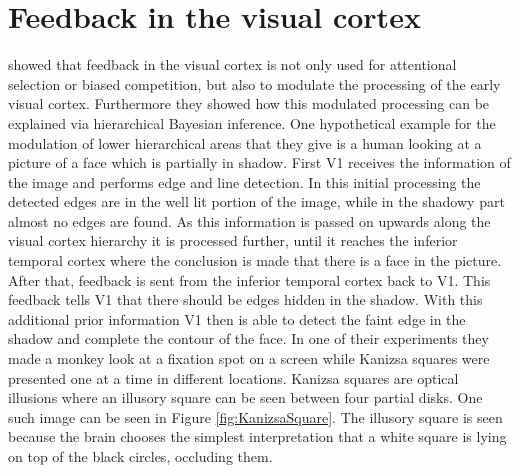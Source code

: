 \section{Feedback in the visual cortex}
\label{section:feedbackInVisualCortex}
\citet{HierachicalBayesVisualCortex} showed that feedback in the visual cortex is not only used for attentional selection or biased competition, but also to modulate the processing of the early visual cortex. Furthermore they showed how this modulated processing can be explained via hierarchical Bayesian inference. One hypothetical example for the modulation of lower hierarchical areas that they give is a human looking at a picture of a face which is partially in shadow. First V1 receives the information of the image and performs edge and line detection. In this initial processing the detected edges are in the well lit portion of the image, while in the shadowy part almost no edges are found. As this information is passed on upwards along the visual cortex hierarchy it is processed further, until it reaches the inferior temporal cortex where the conclusion is made that there is a face in the picture. After that, feedback is sent from the inferior temporal cortex back to V1. This feedback tells V1 that there should be edges hidden in the shadow. With this additional prior information V1 then is able to detect the faint edge in the shadow and complete the contour of the face. 
In one of their experiments they made a monkey look at a fixation spot on a screen while Kanizsa squares were presented one at a time in different locations. Kanizsa squares are optical illusions where an illusory square can be seen between four partial disks. One such image can be seen in Figure \ref{fig:KanizsaSquare}. The illusory square is seen because the brain chooses the simplest interpretation that a white square is lying on top of the black circles, occluding them.
